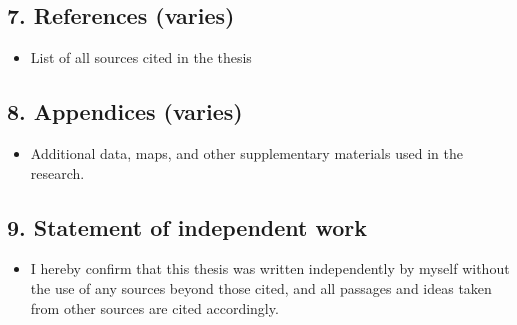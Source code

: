 \subsection*{7. References (varies)}
\begin{itemize}
\item List of all sources cited in the thesis
\end{itemize}

\subsection*{8. Appendices (varies)}
\begin{itemize}
\item Additional data, maps, and other supplementary materials used in the research.
\end{itemize}


\subsection*{9. Statement of independent work}
\begin{itemize}
\item I hereby confirm that this thesis was written independently by myself without the use of any sources beyond those cited, and all passages and ideas taken from other sources are cited accordingly.
\end{itemize}
